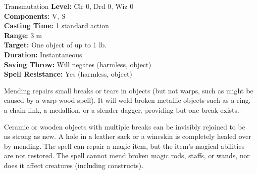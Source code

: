 {Transmutation}
{
	\textbf{Level:}
	Clr 0, Drd 0, Wiz 0\\
	\textbf{Components:}
	V, S\\
	\textbf{Casting Time:}
	1 standard action\\
	\textbf{Range:}
	3 m\\
	\textbf{Target:}
	One object of up to 1 lb.\\
	\textbf{Duration:}
	Instantaneous\\
	\textbf{Saving Throw:}
	Will negates (harmless, object)\\
	\textbf{Spell Resistance:}
	Yes (harmless, object)\\
}
{
	Mending repairs small breaks or tears in objects (but not warps, such as might be caused by a warp wood spell). It will weld broken metallic objects such as a ring, a chain link, a medallion, or a slender dagger, providing but one break exists.

	Ceramic or wooden objects with multiple breaks can be invisibly rejoined to be as strong as new. A hole in a leather sack or a wineskin is completely healed over by mending. The spell can repair a magic item, but the item's magical abilities are not restored. The spell cannot mend broken magic rods, staffs, or wands, nor does it affect creatures (including constructs).

}
